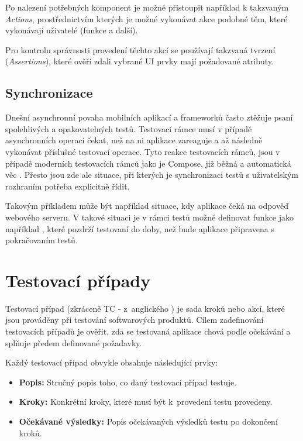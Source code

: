 Po nalezení potřebných komponent je možné přistoupit například k takzvaným \textit{Actions}, prostřednictvím kterých je možné vykonávat akce podobné
těm, které vykonávají uživatelé (funkce  a další).

Pro kontrolu správnosti provedení těchto akcí se používají takzvaná tvrzení (\textit{Assertions}), které ověří zdali vybrané UI prvky
mají požadované atributy. \cite{testingUIApis}

\begin{sloppypar}
\subsection*{Synchronizace}
Dnešní asynchronní povaha mobilních aplikací a frameworků často ztěžuje psaní spolehlivých a opakovatelných testů. Testovací rámce
musí v případě asynchronních operací čekat, než na ni aplikace zareaguje a až následně vykonávat příslušné testovací operace. 
Tyto reakce testovacích rámců, jsou v případě moderních testovacích rámců jako je Compose, již běžná a automatická věc \cite{testingUISynchro}. Přesto jsou zde ale
situace, při kterých je synchronizaci testů s uživatelským rozhraním potřeba explicitně řídit.

Takovým příkladem může být například situace, kdy aplikace čeká na odpověď webového serveru. V takové situaci je v rámci testů možné 
definovat funkce jako například , které pozdrží testovaní do doby, než bude aplikace
připravena s pokračovaním testů.
\end{sloppypar}


\section{Testovací případy}\label{testCases}
Testovací případ (zkráceně TC - z~anglického ) je sada kroků nebo akcí, které jsou prováděny při testování softwarových produktů. 
Cílem zadefinování testovacích případů je ověřit, zda se testovaná aplikace chová podle očekávání a splňuje předem definované požadavky. 

\bigskip

Každý testovací případ obvykle obsahuje následující prvky:

\begin{itemize}
  \item \textbf{Popis:} Stručný popis toho, co daný testovací případ testuje. %
  \item \textbf{Kroky:} Konkrétní kroky, které musí být k~provedení testu provedeny.
  \item \textbf{Očekávané výsledky:} Popis očekávaných výsledků testu po dokončení kroků.
\end{itemize}

